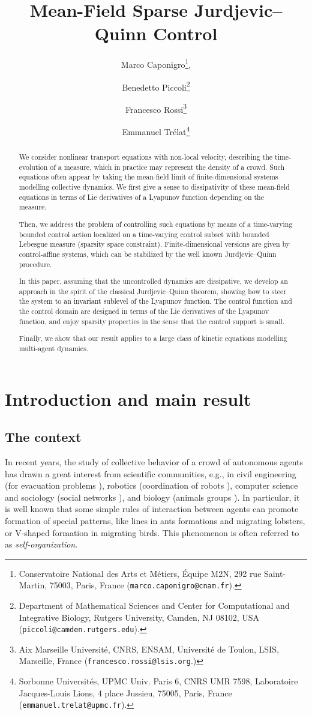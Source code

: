 \documentclass{article}
\title{Mean-Field Sparse Jurdjevic--Quinn Control}
\author{Marco Caponigro\footnote{Conservatoire National des Arts et M\'etiers, \'Equipe M2N,
292 rue Saint-Martin, 75003, Paris, France ({\tt\small marco.caponigro@cnam.fr}).}, 
\and
Benedetto Piccoli\footnote{Department of Mathematical Sciences and Center for Computational and Integrative Biology, Rutgers University, Camden, NJ 08102, USA ({\tt\small piccoli@camden.rutgers.edu}).}
\and
Francesco Rossi\footnote{Aix Marseille Universit\'e, CNRS, ENSAM, Universit\'e de Toulon, LSIS, Marseille, France ({\tt\small francesco.rossi@lsis.org}.)
}
\and
Emmanuel Tr\'elat\footnote{Sorbonne Universit\'es, UPMC Univ. Paris 6, CNRS UMR 7598, Laboratoire Jacques-Louis Lions, 4 place Jussieu, 75005, Paris, France ({\tt\small emmanuel.trelat@upmc.fr}).}}
\theoremstyle{definition}\newtheorem{remark}{Remark}
\begin{document}
\maketitle

\begin{abstract}
We consider nonlinear transport equations with non-local velocity, describing the time-evolution of a measure, which in practice may represent the density of a crowd. 
Such equations often appear by taking the mean-field limit of finite-dimensional systems modelling collective dynamics.
We first give a sense to dissipativity of these mean-field equations in terms of Lie derivatives of a Lyapunov function depending on the measure.

Then, we address the problem of controlling such equations by means of a time-varying bounded control action localized on a time-varying control subset with bounded Lebesgue measure (sparsity space constraint). Finite-dimensional versions are given by control-affine systems, which can be stabilized by the well known Jurdjevic--Quinn procedure.

In this paper, assuming that the uncontrolled dynamics are dissipative, we develop an approach in the spirit of the classical Jurdjevic--Quinn theorem, showing how to steer the system to an invariant sublevel of the Lyapunov function. The control function and the control domain are designed in terms of the Lie derivatives of the Lyapunov function, and enjoy sparsity properties in the sense that the control support is small.

Finally, we show that our result applies to a large class of kinetic equations modelling multi-agent dynamics. 
\end{abstract}






\section{Introduction and main result}
\subsection{The context}
In recent years, the study of collective behavior of a crowd of autonomous agents has drawn a great interest from scientific communities, e.g., in civil engineering (for evacuation problems \cite{CPT-14,HFV-00}), robotics (coordination of robots \cite{BCM,JLM-03,OSFM,RME}), computer science and sociology (social networks \cite{HG-02}), and biology (animals groups \cite{BB-11,CKJRF,G-08}). In particular, it is well known that some simple rules of interaction between agents can promote formation of special patterns, like lines in ants formations and migrating lobsters, or V-shaped formation in migrating birds. This phenomenon is often referred to as {\em self-organization}.
\end{document}

